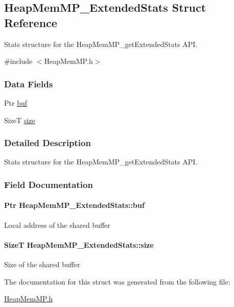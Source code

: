 \subsection{Heap\-Mem\-M\-P\-\_\-\-Extended\-Stats Struct Reference}
\label{struct_heap_mem_m_p___extended_stats}


Stats structure for the Heap\-Mem\-M\-P\-\_\-get\-Extended\-Stats A\-P\-I.  




{\ttfamily \#include $<$Heap\-Mem\-M\-P.\-h$>$}

\subsubsection*{Data Fields}
\begin{DoxyCompactItemize}
\item 
Ptr \hyperlink{struct_heap_mem_m_p___extended_stats_acff359a735a267f8d845c7b910413ddc}{buf}
\item 
Size\-T \hyperlink{struct_heap_mem_m_p___extended_stats_a23b8e4b1c1d36b954ca7dacffad1c940}{size}
\end{DoxyCompactItemize}


\subsubsection{Detailed Description}
Stats structure for the Heap\-Mem\-M\-P\-\_\-get\-Extended\-Stats A\-P\-I. 

\subsubsection{Field Documentation}
\paragraph[{buf}]{\setlength{\rightskip}{0pt plus 5cm}Ptr Heap\-Mem\-M\-P\-\_\-\-Extended\-Stats\-::buf}\label{struct_heap_mem_m_p___extended_stats_acff359a735a267f8d845c7b910413ddc}
Local address of the shared buffer 
\paragraph[{size}]{\setlength{\rightskip}{0pt plus 5cm}Size\-T Heap\-Mem\-M\-P\-\_\-\-Extended\-Stats\-::size}\label{struct_heap_mem_m_p___extended_stats_a23b8e4b1c1d36b954ca7dacffad1c940}
Size of the shared buffer 

The documentation for this struct was generated from the following file\-:\begin{DoxyCompactItemize}
\item 
\hyperlink{_heap_mem_m_p_8h}{Heap\-Mem\-M\-P.\-h}\end{DoxyCompactItemize}
